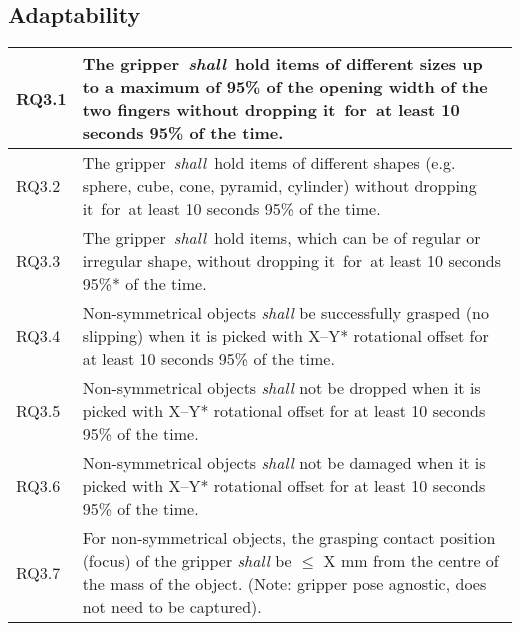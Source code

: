 \documentclass[lettersize,journal]{IEEEtran}
\begin{document}
\subsection{Adaptability} \label{adaptability}
\begin{center}
	\begin{tabular}{|p{7mm}|p{72mm}|}
		\hline
RQ3.1 & The gripper \emph{shall} hold items of different sizes up to a maximum of 95\% of the opening width of the two fingers without dropping it for at least 10 seconds 95\% of the time. \\
\hline
RQ3.2 & The gripper \emph{shall} hold items of different shapes (e.g. sphere, cube, cone, pyramid, cylinder) without dropping it for at least 10 seconds 95\% of the time. \\
\hline
RQ3.3 & The gripper \emph{shall} hold items, which can be of regular or irregular shape, without dropping it for at least 10 seconds 95\%* of the time. \\ 
\hline
RQ3.4 & Non-symmetrical objects \emph{shall} be successfully grasped (no slipping) when it is picked with X–Y* rotational offset for at least 10 seconds 95\% of the time.  \\ 
\hline
RQ3.5 & Non-symmetrical objects \emph{shall} not be dropped when it is picked with X–Y* rotational offset for at least 10 seconds 95\% of the time.\\
\hline
RQ3.6 & Non-symmetrical objects \emph{shall} not be damaged when it is picked with X–Y* rotational offset for at least 10 seconds 95\% of the time.\\
\hline
RQ3.7 & For non-symmetrical objects, the grasping contact position (focus) of the gripper \emph{shall} be $\le$ X mm from the centre of the mass of the object. (Note: gripper pose agnostic, does not need to be captured).\\	[1ex] 
\hline
	\end{tabular}
\end{center}
\end{document}
